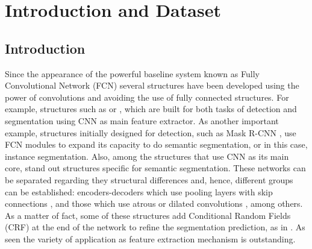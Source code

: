 
\chapter{Introduction and Dataset} %

\label{Chapter1} %


\newcommand{\keyword}[1]{\textbf{#1}}
\newcommand{\tabhead}[1]{\textbf{#1}}
\newcommand{\code}[1]{\texttt{#1}}
\newcommand{\file}[1]{\texttt{\bfseries#1}}
\newcommand{\option}[1]{\texttt{\itshape#1}}


\section{Introduction}

Since the appearance of the powerful baseline system known as Fully Convolutional Network (FCN) \parencite{Reference1} several structures have been developed using the power of convolutions and avoiding the use of fully connected structures. For example, structures such as \parencite{Reference2} or \parencite{Reference3}, which are built for both tasks of detection and segmentation using CNN as main feature extractor. As another important example, structures initially designed for detection, such as Mask R-CNN \parencite{Reference4}, use FCN modules to expand its capacity to do semantic segmentation, or in this case, instance segmentation. Also, among the structures that use CNN as its main core,  stand out structures specific for semantic segmentation. These networks can be separated regarding they structural differences and, hence, different groups can be established: encoders-decoders which use pooling layers with skip connections \parencite{Reference5}, \parencite{Reference6} and those which use atrous or dilated convolutions \parencite{Reference7}, among others. As a matter of fact, some of these structures add Conditional Random Fields (CRF) at the end of the network to refine the segmentation prediction, as in \parencite{Reference8}. As seen the variety of application as feature extraction mechanism is outstanding.  \newline

